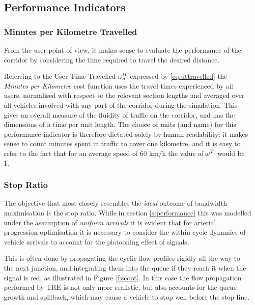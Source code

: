 \subsection{Performance Indicators}

\subsubsection{Minutes per Kilometre Travelled}
From the user point of view, it makes sense to evaluate the performance of the corridor by considering the time required to travel the desired distance.

Referring to the User Time Travelled $\omega_{a}^{tt}$ expressed by \eqref{eq:uttravelled} the \emph{Minutes per Kilometre} cost function
uses the travel times experienced by all users, normalised with respect to the relevant section lengths and averaged over all vehicles involved with any part of the corridor during the simulation. This gives an overall measure of the fluidity of traffic on the corridor, and has the dimensions of a time per unit length. The choice of units (and name) for this performance indicator is therefore dictated solely by human-readability: it makes sense to count minutes spent in traffic to cover one kilometre, and it is easy to refer to the fact that for an average speed of 60 km/h the value of $\omega_{}^{T}$ would be 1.

\subsubsection{Stop Ratio}
The objective that most closely resembles the \emph{ideal} outcome of bandwidth maximisation is the stop ratio. While in section \ref{s:performance} this was modelled under the assumption of \emph{uniform arrivals} it is evident that for arterial progression optimisation it is necessary to consider the within-cycle dynamics of vehicle arrivals to account for the platooning effect of signals.

This is often done by propagating the cyclic flow profiles rigidly all the way to the next junction, and integrating them into the queue if they reach it when the signal is red, as illustrated in Figure \ref{f:scoot}. In this case the flow propagation performed by TRE is not only more realistic, but also accounts for the queue growth and spillback, which may cause a vehicle to stop well before the stop line.

